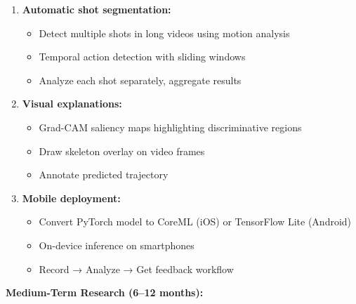 \documentclass[11pt,a4paper]{article}
\begin{document}
\begin{enumerate}
\item \textbf{Automatic shot segmentation:}
   \begin{itemize}
   \item Detect multiple shots in long videos using motion analysis
   \item Temporal action detection with sliding windows
   \item Analyze each shot separately, aggregate results
   \end{itemize}

\item \textbf{Visual explanations:}
   \begin{itemize}
   \item Grad-CAM saliency maps highlighting discriminative regions
   \item Draw skeleton overlay on video frames
   \item Annotate predicted trajectory
   \end{itemize}

\item \textbf{Mobile deployment:}
   \begin{itemize}
   \item Convert PyTorch model to CoreML (iOS) or TensorFlow Lite (Android)
   \item On-device inference on smartphones
   \item Record → Analyze → Get feedback workflow
   \end{itemize}
\end{enumerate}

\textbf{Medium-Term Research (6--12 months):}
\end{document}

